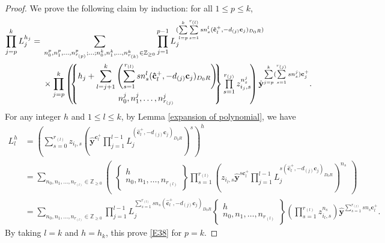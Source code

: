\documentclass[pdftex]{sigma}
\newcommand{\Z}{\mathbb{Z}}
\numberwithin{equation}{section}
\begin{document}
\begin{proof}
 We prove the following claim by induction: for all $1\le p\le k$,
\begin{align}
\prod\limits_{j=p}^{k}L_j^{h_j}
={}&\sum_{n_0^p,n_{1}^{p},\dots,n_{r_{(p)}}^p;\dots;n_0^{k},n_{1}^{k},\dots,n_{r_{(k)}}^k\in\mathbb{Z}_{\ge 0}}\prod_{j=1}^{p-1}L_j^{(\sum\limits_{l=p}^{k}\sum\limits_{s=1}^{r_{(l)}}s n_{s}^{l}(\mathbf{\hat{c}}_{l}^+,-d_{(j)}\mathbf{c}_{j})_{D_0R})}\nonumber\\
&\times \prod\limits_{j=p}^{k}\begin{pmatrix}\!\!
 \begin{Bmatrix}\displaystyle h_j+\sum\limits_{l=j+1}^{k}\left(\sum\limits_{s=1}^{r_{(l)}}s n_{s}^{l}(\mathbf{\hat{c}}_{l}^+,-d_{(j)}\mathbf{c}_{j})_{D_0R}\right)\!\!\vspace{1mm}\\ n_0^j,n_{1}^j,\dots,n_{r_{(j)}}^j\end{Bmatrix}\prod\limits_{s=1}^{r_{(j)}}z_{i_j,s}^{n_s^j}\!
\end{pmatrix}\hat{\mathbf{y}}^{\sum\limits_{j=p}^{k}(\sum\limits_{s=1}^{r_{(j)}}s n_s^j)\mathbf{c}_{j}^+}.\!\!\!\!\label{E38}
 \end{align}
 For any integer $h$ and $1\leq l\leq k$, by Lemma \ref{expansion of polynomial}, we have
 \begin{align*}
 L_l^{h}&=\left(\sum\limits_{s=0}^{r_{(l)}}z_{i_l,s}
 \left(\hat{\mathbf{y}}^{\mathbf{c}_{l}^+}\prod\limits_{j=1}^{l-1}L_j^{(\mathbf{\hat{c}}_{l}^+,-d_{(j)}\mathbf{c}_{j})_{D_0R}}\right)^s\right)^{h} \\ &=\sum\limits_{n_{0},n_1,\dots,n_{r_{(l)}}\in\mathbb{Z}_{\ge 0}}\begin{pmatrix}\begin{Bmatrix}h\\ n_0,n_1,\dots,n_{r_{(l)}}\end{Bmatrix}\prod\limits_{s=1}^{r_{(l)}}\left(z_{i_l,s}\hat{\mathbf{y}}^{s \mathbf{c}_{l}^+}\prod\limits_{j=1}^{l-1}L_j^{s(\mathbf{\hat{c}}_{l}^+,-d_{(j)}\mathbf{c}_{j})_{D_0R}}\right)^{n_s}\end{pmatrix} \\
  &=\sum\limits_{n_{0},n_1,\dots,n_{r_{(l)}}\in \Z_{\geq 0}}\prod\limits_{j=1}^{l-1}L_j^{\sum\limits_{s=1}^{r_{(l)}}s n_s(\mathbf{\hat{c}}_{l}^+,-d_{(j)}\mathbf{c}_{j})_{D_0R}}\begin{Bmatrix}h\\ n_0,n_1,\dots,n_{r_{(l)}}\end{Bmatrix}\left(\prod\limits_{s=1}^{r_{(l)}}z_{i_l,s}^{n_s}\right)\hat{\mathbf{y}}^{\sum\limits_{s=1}^{r_{(l)}}s n_{s}\mathbf{c}_{l}^+}.
 \end{align*}
 By taking $l=k$ and $h=h_k$, this prove \eqref{E38} for $p=k$.


\end{proof}
\end{document}
